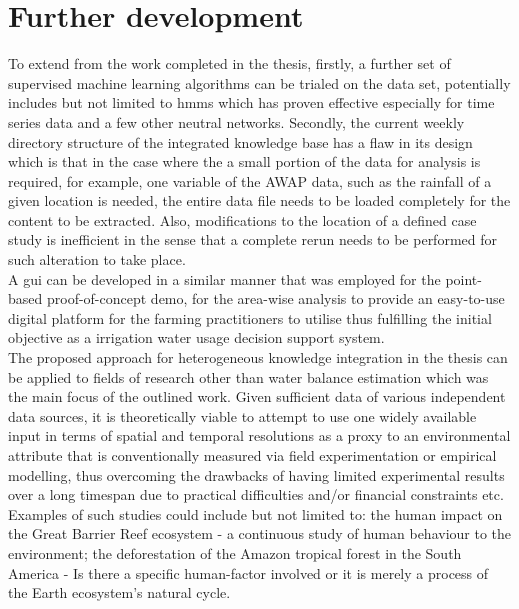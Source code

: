 \section{Further development}
To extend from the work completed in the thesis, firstly, a further set of supervised machine learning algorithms can be trialed on the data set, potentially includes but not limited to \acp{hmm} which has proven effective especially for time series data and a few other neutral networks. Secondly, the current weekly directory structure of the integrated knowledge base has a flaw in its design which is that in the case where the a small portion of the data for analysis is required, for example, one variable of the AWAP data, such as the rainfall of a given location is needed, the entire data file needs to be loaded completely for the content to be extracted.  Also, modifications to the location of a defined case study is inefficient in the sense that a complete rerun needs to be performed for such alteration to take place.\\
\newline
A \ac{gui} can be developed in a similar manner that was employed for the point-based proof-of-concept demo, for the area-wise analysis to provide an easy-to-use digital platform for the farming practitioners to utilise thus fulfilling the initial objective as a irrigation water usage decision support system.\\
\newline
The proposed approach for heterogeneous knowledge integration in the thesis can be applied to fields of research other than water balance estimation which was the main focus of the outlined work. Given sufficient data of various independent data sources, it is theoretically viable to attempt to use one widely available input in terms of spatial and temporal resolutions as a proxy to an environmental attribute that is conventionally measured via field experimentation or empirical modelling, thus overcoming the drawbacks of having limited experimental results over a long timespan due to practical difficulties and/or financial constraints etc. Examples of such studies could include but not limited to: the human impact on the Great Barrier Reef ecosystem - a continuous study of human behaviour to the environment; the deforestation of the Amazon tropical forest in the South America - Is there a specific human-factor involved or it is merely a process of the Earth ecosystem's natural cycle.